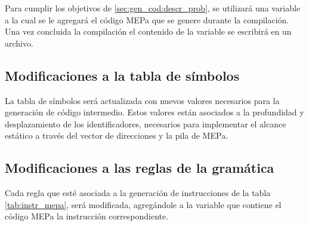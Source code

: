Para cumplir los objetivos de \ref{sec:gen_cod:descr_prob}, se utilizará una variable a la cual se le agregará el código MEPa que se genere durante la compilación. Una vez concluida la compilación el contenido de la variable se escribirá en un archivo.

\subsection{Modificaciones a la tabla de símbolos}
La tabla de símbolos será actualizada con nuevos valores necesarios para la generación de código intermedio. Estos valores están asociados a la profundidad y desplazamiento de los identificadores, necesarios para implementar el alcance estático a través del vector de direcciones y la pila de MEPa.

\subsection{Modificaciones a las reglas de la gramática}
Cada regla que esté asociada a la generación de instrucciones de la tabla \ref{tab:instr_mepa}, será modificada, agregándole a la variable que contiene el código MEPa la instrucción correspondiente.

